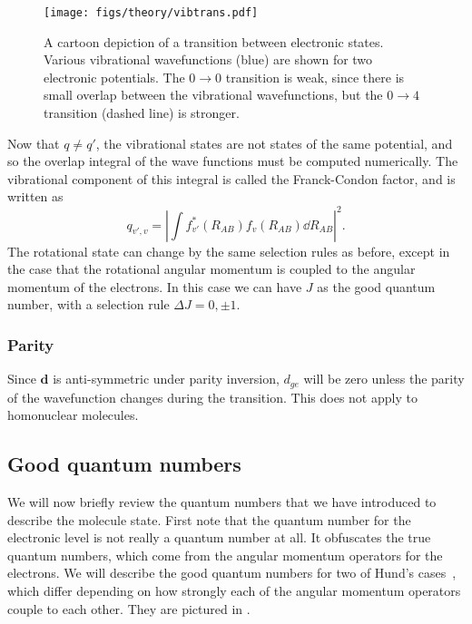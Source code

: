 \begin{figure}
  \centering
  \texttt{[image: figs/theory/vibtrans.pdf]}
  \caption[An electronic transition in a diatomic molecule]{
    A cartoon depiction of a transition between electronic states. Various
    vibrational wavefunctions (blue) are shown for two electronic potentials.
    The $0\rightarrow0$ transition is weak, since there is small overlap
    between the vibrational wavefunctions, but the $0\rightarrow4$ transition
    (dashed line) is stronger.
  }
  \label{theory:fig:vibtrans}
\end{figure}

Now that $q\neq q'$, the vibrational states are not states of the same
potential, and so the overlap integral of the wave functions must
be computed numerically. The vibrational component of this integral is called
the Franck-Condon factor, and is written as
%
\begin{equation}
  q_{v',v} = \left|\int f^*_{v'}(R_{AB})f_v(R_{AB})\dd R_{AB}\right|^2.
\end{equation}
%
The rotational state can change by the same selection rules as before, except
in the case that the rotational angular momentum is coupled to the angular
momentum of the electrons. In this case we can have $J$ as the good quantum
number, with a selection rule $\Delta J = 0, \pm1$.

\subsubsection{Parity}

Since $\mathbf{d}$ is anti-symmetric under parity inversion, $d_{ge}$ will be
zero unless the parity of the wavefunction changes during the transition. This
does not apply to homonuclear molecules. 

\subsection{Good quantum numbers}
\label{theory:qnos}

We will now briefly review the quantum numbers that we have introduced to
describe the molecule state. First note that the quantum number for the
electronic level is not really a quantum number at all. It obfuscates the true
quantum numbers, which come from the angular momentum operators for the
electrons. We will describe the good quantum numbers for two of Hund's
cases~\cite{brown_carrington_2003}, which differ depending on how strongly each
of the angular momentum operators couple to each other. They are pictured in
.

